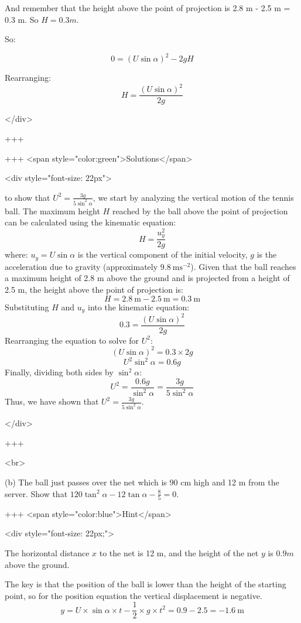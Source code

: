 And remember that the height above the point of projection is 2.8 m - 2.5 m = 0.3 m. So \(H = 0.3 m\).

So:

$$ 0 = (U \sin \alpha)^2 - 2gH $$

Rearranging:
$$ H = \frac{(U \sin \alpha)^2}{2g} $$

</div>

+++

+++ <span style="color:green">Solutions</span>

<div style="font-size: 22px">

to show that \( U^{2} = \frac{3g}{5 \sin^{2} \alpha} \), we start by analyzing the vertical motion of the tennis ball.
The maximum height \( H \) reached by the ball above the point of projection can be calculated using the kinematic equation:
$$ H = \frac{u_y^2}{2g} $$
where:
\( u_y = U \sin \alpha \) is the vertical component of the initial velocity,
\( g \) is the acceleration due to gravity (approximately \( 9.8 \mathrm{~ms}^{-2} \)).
Given that the ball reaches a maximum height of 2.8 m above the ground and is projected from a height of 2.5 m, the height above the point of projection is:
$$ H = 2.8 \mathrm{~m} - 2.5 \mathrm{~m} = 0.3 \mathrm{~m} $$
Substituting \( H \) and \( u_y \) into the kinematic equation:
$$ 0.3 = \frac{(U \sin \alpha)^2}{2g} $$
Rearranging the equation to solve for \( U^2 \):
$$ (U \sin \alpha)^2 = 0.3 \times 2g $$
$$ U^2 \sin^2 \alpha = 0.6g $$
Finally, dividing both sides by \( \sin^2 \alpha \):
$$ U^2 = \frac{0.6g}{\sin^2 \alpha} = \frac{3g}{5 \sin^2 \alpha} $$
Thus, we have shown that \( U^{2} = \frac{3g}{5 \sin^{2} \alpha} \).

</div>

+++

<br>

(b) The ball just passes over the net which is 90 cm high and 12 m from the server. Show that $120 \tan ^{2} \alpha-12 \tan \alpha-\frac{8}{5}=0$.

+++ <span style="color:blue">Hint</span>

<div style="font-size: 22px;">

The horizontal distance $x$ to the net is 12 m, and the height of the net $y$ is $0.9 m$ above the ground. 

The key is that the position of the ball is lower than the height of the starting point, so for the position equation the vertical displacement is negative.
$$ y = U \times \sin \alpha \times t - \frac {1}{2} \times g \times t^2 = 0.9 - 2.5 = -1.6 \mathrm{~m} $$

